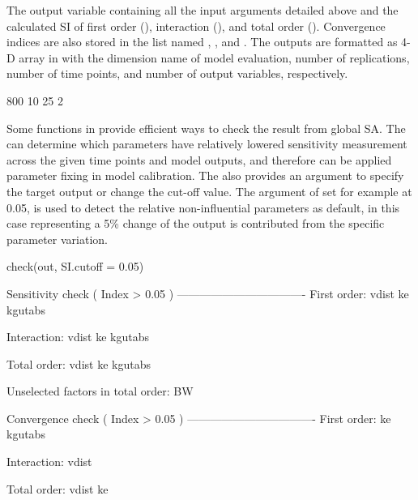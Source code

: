 The output variable  containing all the input arguments
detailed above and the calculated SI of first order (),
interaction (), and total order (). Convergence
indices are also stored in the list named , , and
. The outputs are formatted as 4-D array in  with the
dimension name of model evaluation, number of replications, number of
time points, and number of output variables, respectively.

\begin{Schunk}
\begin{Soutput}
  [1] 800  10  25   2
\end{Soutput}
\end{Schunk}

Some functions in  provide efficient ways to check the
result from global SA. The  can determine which parameters
have relatively lowered sensitivity measurement across the given time
points and model outputs, and therefore can be applied parameter fixing
in model calibration. The  also provides an argument to
specify the target output or change the cut-off value. The argument of
 set for example at 0.05, is used to detect the relative
non-influential parameters as default, in this case representing a 5\%
change of the output is contributed from the specific parameter
variation.

\begin{Schunk}
\begin{Sinput}
check(out, SI.cutoff = 0.05)
\end{Sinput}
\begin{Soutput}
  
  Sensitivity check ( Index > 0.05 )
  ----------------------------------
  First order:
   vdist ke kgutabs 
  
  Interaction:
   vdist ke kgutabs 
  
  Total order:
   vdist ke kgutabs 
  
  Unselected factors in total order:
   BW 
  
  
  Convergence check ( Index > 0.05 )
  ----------------------------------
  First order:
   ke kgutabs 
  
  Interaction:
   vdist 
  
  Total order:
   vdist ke
\end{Soutput}
\end{Schunk}

